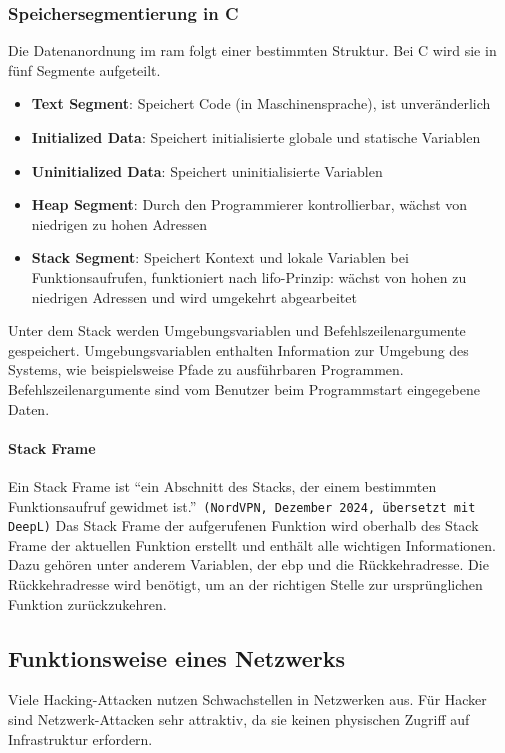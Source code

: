 \documentclass[11pt, a4paper]{article}
\begin{document}
\subsubsection{Speichersegmentierung in C}\label{subsubsec:speichersegmentierung}
Die Datenanordnung im \gls{ram} folgt einer bestimmten Struktur. Bei C wird sie in fünf Segmente aufgeteilt.
\begin{itemize}
	\item \textbf{Text Segment}: Speichert Code (in Maschinensprache), ist unveränderlich
	\item \textbf{Initialized Data}: Speichert initialisierte globale und statische Variablen
	\item \textbf{Uninitialized Data}: Speichert uninitialisierte Variablen
	\item \textbf{Heap Segment}: Durch den Programmierer kontrollierbar, wächst von niedrigen zu hohen Adressen~\cite{StackHeapYoutube:online}
	\item \textbf{Stack Segment}: Speichert Kontext und lokale Variablen bei Funktionsaufrufen, funktioniert nach \gls{lifo}-Prinzip: wächst von hohen zu niedrigen Adressen und wird umgekehrt abgearbeitet~\cite{StackHeapYoutube:online}
\end{itemize}
Unter dem Stack werden Umgebungsvariablen und Befehlszeilenargumente gespeichert. Umgebungsvariablen enthalten Information zur Umgebung des Systems, wie beispielsweise Pfade zu ausführbaren Programmen. ~\cite{UmgebungsMicrosoft:online} Befehlszeilenargumente sind vom Benutzer beim Programmstart eingegebene Daten. 

\paragraph{Stack Frame}
Ein Stack Frame ist ``ein Abschnitt des Stacks, der einem bestimmten Funktionsaufruf gewidmet ist.''~\texttt{(NordVPN, Dezember 2024, übersetzt mit DeepL)}\cite{StackFrameNordVPN:online} Das Stack Frame der aufgerufenen Funktion wird oberhalb des Stack Frame der aktuellen Funktion erstellt und enthält alle wichtigen Informationen. Dazu gehören unter anderem Variablen, der \gls{ebp} und die Rückkehradresse. Die Rückkehradresse wird benötigt, um an der richtigen Stelle zur ursprünglichen Funktion zurückzukehren.

\subsection{Funktionsweise eines Netzwerks}
Viele Hacking-Attacken nutzen Schwachstellen in Netzwerken aus. Für Hacker sind Netzwerk-Attacken sehr attraktiv, da sie keinen physischen Zugriff auf Infrastruktur erfordern.
\end{document}
